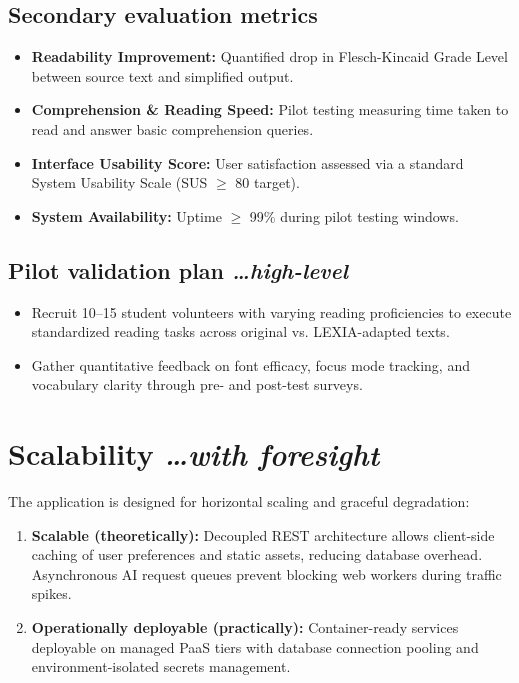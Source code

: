 \documentclass[11pt,a4paper]{article}
\newcommand{\BvrHint}[1]{%
  {\normalfont\normalsize\itshape\hfill #1}}
\begin{document}
\subsection{Secondary evaluation metrics}
\begin{itemize}[leftmargin=0.7cm]
    \item \textbf{Readability Improvement:} Quantified drop in Flesch-Kincaid Grade Level between source text and simplified output.
    \item \textbf{Comprehension \& Reading Speed:} Pilot testing measuring time taken to read and answer basic comprehension queries.
    \item \textbf{Interface Usability Score:} User satisfaction assessed via a standard System Usability Scale (SUS $\ge$ 80 target).
    \item \textbf{System Availability:} Uptime $\ge$ 99\% during pilot testing windows.
\end{itemize}

\subsection{Pilot validation plan %
\BvrHint{\ldots high-level}}
\begin{itemize}[leftmargin=0.7cm]
    \item Recruit 10--15 student volunteers with varying reading proficiencies to execute standardized reading tasks across original vs. LEXIA-adapted texts.
    \item Gather quantitative feedback on font efficacy, focus mode tracking, and vocabulary clarity through pre- and post-test surveys.
\end{itemize}

\section{Scalability %
\BvrHint{\ldots with foresight}}
The application is designed for horizontal scaling and graceful degradation:
\begin{enumerate}[leftmargin=0.7cm]
    \item \textbf{Scalable (theoretically):} Decoupled REST architecture allows client-side caching of user preferences and static assets, reducing database overhead. Asynchronous AI request queues prevent blocking web workers during traffic spikes.
    \item \textbf{Operationally deployable (practically):} Container-ready services deployable on managed PaaS tiers with database connection pooling and environment-isolated secrets management.
\end{enumerate}
\end{document}
